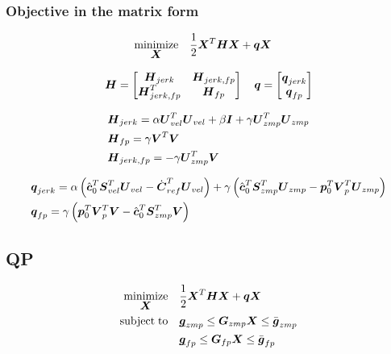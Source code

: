 \subsubsection{Objective in the matrix form}
\begin{equation*}
\begin{split}
    \minimize{\V{X}}    & \frac{1}{2} \V{X}^T\M{H}\V{X} + \V{q} \V{X}
\end{split}
\end{equation*}

\begin{equation*}
\M{H} = 
    \begin{bmatrix}
        \M{H}_{jerk}        &   \M{H}_{jerk,fp}\\
        \M{H}_{jerk,fp}^T   &   \M{H}_{fp}
    \end{bmatrix}
\quad
\V{q} = 
    \begin{bmatrix}
        \V{q}_{jerk}\\
        \V{q}_{fp}
    \end{bmatrix}
\end{equation*}

\begin{equation*}
\begin{split}
& \M{H}_{jerk} = 
    \alpha \M{U}_{vel}^T \M{U}_{vel} 
    + \beta \M{I}
    + \gamma \M{U}_{zmp}^T \M{U}_{zmp}\\
& \M{H}_{fp} = 
    \gamma \M{V}^T \M{V}\\
& \M{H}_{jerk,fp} = 
    - \gamma \M{U}_{zmp}^T \M{V}
\end{split}
\end{equation*}


\begin{equation*}
\begin{split}
& \V{q}_{jerk} = 
    \alpha 
    \left(
        \cstate_0^T \M{S}_{vel}^T \M{U}_{vel}
        -
        \cVel_{ref}^T \M{U}_{vel} 
    \right)
    + 
    \gamma 
    \left(
        \cstate_0^T \M{S}_{zmp}^T \M{U}_{zmp}
        - 
        \fp_0^T \M{V}_p^T \M{U}_{zmp} 
    \right)\\
& \V{q}_{fp} =
    \gamma 
    \left(
        \fp_0^T \M{V}_p^T \M{V}
        - 
        \cstate_0^T \M{S}_{zmp}^T \M{V}
    \right)
\end{split}
\end{equation*}


\subsection{QP}
\begin{equation*}
\begin{split}
    \minimize{\V{X}}    & \frac{1}{2} \V{X}^T\M{H}\V{X} + \V{q} \V{X}\\
    \subjectto          & \underbar{\V{g}}_{zmp}  \le  \M{G}_{zmp} \V{X}  \le  \bar{\V{g}}_{zmp}\\
                        & \underbar{\V{g}}_{fp}  \le  \M{G}_{fp} \V{X}  \le  \bar{\V{g}}_{fp}
\end{split}
\end{equation*}
